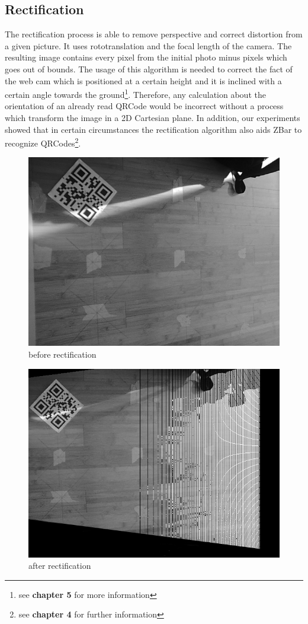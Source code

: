 \subsection{Rectification}
The rectification process is able to remove perspective and correct distortion from a given picture.
It uses rototranslation and the focal length of the camera. The resulting image contains every pixel from the initial photo minus pixels which goes out of bounds. The usage of this algorithm is needed to correct the fact of the web cam which is positioned at a certain height and it is inclined with a certain angle towards the ground\footnote{see \textbf{chapter 5} for more information}. Therefore, any calculation about the orientation of an already read QRCode would be incorrect without a process which transform the image in a 2D Cartesian plane. In addition, our experiments showed that in certain circumstances the rectification algorithm also aids ZBar to recognize QRCodes\footnote{see \textbf{chapter 4}  for further information}. 
\vspace{1.25cm}
\begin{figure}[hbt]
    \centering
    \includegraphics[scale=0.3]{img/beforerect.png}
    \caption{before rectification}
\end{figure}
\begin{figure}[hbt]
    \centering
    \includegraphics[scale=0.3]{img/afterrect.png}
    \caption{after rectification}
\end{figure}




 
